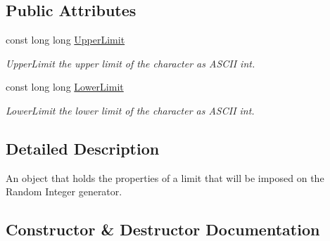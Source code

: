 \subsection*{Public Attributes}
\begin{DoxyCompactItemize}
\item 
\mbox{\label{classtestcaser_1_1maker_1_1RandomIntegerLimit_a993debb42b11e472b19bcb2f2f5f2110}} 
const long long \hyperlink{classtestcaser_1_1maker_1_1RandomIntegerLimit_a993debb42b11e472b19bcb2f2f5f2110}{Upper\+Limit}
\begin{DoxyCompactList}\small\item\em Upper\+Limit the upper limit of the character as A\+S\+C\+II int. \end{DoxyCompactList}\item 
\mbox{\label{classtestcaser_1_1maker_1_1RandomIntegerLimit_ad564182c528cdc7a96443c4a4febe1c1}} 
const long long \hyperlink{classtestcaser_1_1maker_1_1RandomIntegerLimit_ad564182c528cdc7a96443c4a4febe1c1}{Lower\+Limit}
\begin{DoxyCompactList}\small\item\em Lower\+Limit the lower limit of the character as A\+S\+C\+II int. \end{DoxyCompactList}\end{DoxyCompactItemize}


\subsection{Detailed Description}
An object that holds the properties of a limit that will be imposed on the Random Integer generator. 

\subsection{Constructor \& Destructor Documentation}
\mbox{\label{classtestcaser_1_1maker_1_1RandomIntegerLimit_ae70b7c715a632c4a079a0c37452decbf}} 
